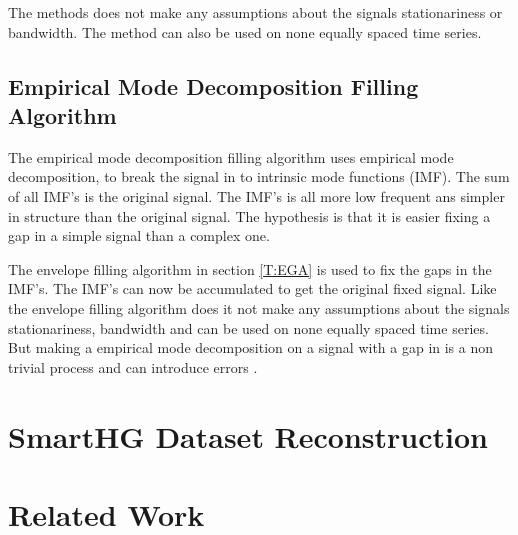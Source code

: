 The methods does not make any assumptions about the signals stationariness or bandwidth. The method can also be used on none equally spaced time series. 

\subsection{Empirical Mode Decomposition Filling Algorithm}
The empirical mode decomposition filling algorithm uses empirical mode decomposition, to break the signal in to intrinsic mode functions (IMF). The sum of all IMF's is the original signal. The IMF's is all more low frequent ans simpler in structure than the original signal. The hypothesis is that it is easier fixing a gap in a simple signal than a complex one. 

The envelope filling algorithm in section \ref{T:EGA} is used to fix the gaps in the IMF's. The IMF's can now be accumulated to get the original fixed signal. Like the envelope filling algorithm does it not make any assumptions about the signals stationariness, bandwidth and can be used on none equally spaced time series. But making a empirical mode decomposition on a signal with a gap in is a non trivial process and can introduce errors \citep{RefWorks:16}. 

\section{SmartHG Dataset Reconstruction}

\section{Related Work}